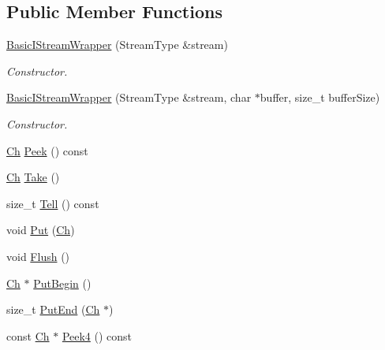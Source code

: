 \subsection*{Public Member Functions}
\begin{DoxyCompactItemize}
\item 
\mbox{\hyperlink{classrapidjson_1_1_basic_i_stream_wrapper_a2b4e069522fa9119685f1cee836e5cfa}{Basic\+I\+Stream\+Wrapper}} (Stream\+Type \&stream)
\begin{DoxyCompactList}\small\item\em Constructor. \end{DoxyCompactList}\item 
\mbox{\hyperlink{classrapidjson_1_1_basic_i_stream_wrapper_acd380a93ccc01d02aef95ea2a926e154}{Basic\+I\+Stream\+Wrapper}} (Stream\+Type \&stream, char $\ast$buffer, size\+\_\+t buffer\+Size)
\begin{DoxyCompactList}\small\item\em Constructor. \end{DoxyCompactList}\item 
\mbox{\hyperlink{classrapidjson_1_1_basic_i_stream_wrapper_a5fd972d8cd20b90ba0772aeebf122597}{Ch}} \mbox{\hyperlink{classrapidjson_1_1_basic_i_stream_wrapper_adfae250fbfdf7dda0ee9b3895758e767}{Peek}} () const
\item 
\mbox{\hyperlink{classrapidjson_1_1_basic_i_stream_wrapper_a5fd972d8cd20b90ba0772aeebf122597}{Ch}} \mbox{\hyperlink{classrapidjson_1_1_basic_i_stream_wrapper_ac803b6494e23a3432c6da1ba9cb9abdc}{Take}} ()
\item 
size\+\_\+t \mbox{\hyperlink{classrapidjson_1_1_basic_i_stream_wrapper_a298096361d0d34706ba68af0a68e389f}{Tell}} () const
\item 
void \mbox{\hyperlink{classrapidjson_1_1_basic_i_stream_wrapper_af020a73e0739581f784b68c1f5adb385}{Put}} (\mbox{\hyperlink{classrapidjson_1_1_basic_i_stream_wrapper_a5fd972d8cd20b90ba0772aeebf122597}{Ch}})
\item 
void \mbox{\hyperlink{classrapidjson_1_1_basic_i_stream_wrapper_ab787ec1bce9ec0e4ddc42cde173d3ab1}{Flush}} ()
\item 
\mbox{\hyperlink{classrapidjson_1_1_basic_i_stream_wrapper_a5fd972d8cd20b90ba0772aeebf122597}{Ch}} $\ast$ \mbox{\hyperlink{classrapidjson_1_1_basic_i_stream_wrapper_a5175c92fadc5278b215bad1822b62267}{Put\+Begin}} ()
\item 
size\+\_\+t \mbox{\hyperlink{classrapidjson_1_1_basic_i_stream_wrapper_a06939b6b8f349a611e6dd8ed82274a76}{Put\+End}} (\mbox{\hyperlink{classrapidjson_1_1_basic_i_stream_wrapper_a5fd972d8cd20b90ba0772aeebf122597}{Ch}} $\ast$)
\item 
const \mbox{\hyperlink{classrapidjson_1_1_basic_i_stream_wrapper_a5fd972d8cd20b90ba0772aeebf122597}{Ch}} $\ast$ \mbox{\hyperlink{classrapidjson_1_1_basic_i_stream_wrapper_afaece8ea8d7b73abc0d4942070b41f8a}{Peek4}} () const
\end{DoxyCompactItemize}
